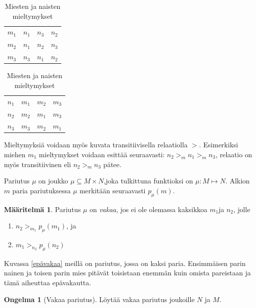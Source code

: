 \documentclass[finnish]{tktltiki2}
\theoremstyle{definition}
\newtheorem{maar}[lau]{Määritelmä}
\newtheorem{ong}{Ongelma}
\theoremstyle{remark}
\begin{document}
\begin{table}[t]\label{mieltymyksettaul}
\centering
	\begin{tabular}{ l | *{2}{c} r }
	 &  \\
	 \hline
 	 $m_{1}$ & $n_{1}$ & $n_{3}$ & $n_{2}$ \\
 	 $m_{2}$ & $n_{1}$ & $n_{2}$ & $n_{3}$ \\
 	 $m_{3}$ & $n_{3}$ & $n_{1}$ & $n_{2}$ \\
	\end{tabular}
	\quad
	\begin{tabular}{ l | *{2}{c} r }
	 &  \\
	 \hline
 	 $n_{1}$ & $m_{1}$ & $m_{2}$ & $m_{3}$ \\
 	 $n_{2}$ & $m_{2}$ & $m_{1}$ & $m_{3}$ \\
 	 $n_{3}$ & $m_{3}$ & $m_{2}$ & $m_{1}$ \\
	\end{tabular}
	\caption{Miesten ja naisten mieltymykset}
\end{table}

Mieltymyksiä voidaan myös kuvata transitiivisella relaatiolla $>$. Esimerkiksi miehen $m_1$ mieltymykset voidaan esittää seuraavasti: $n_2 >_{m} n_1 >_{m} n_3$, relaatio on myös transitiivinen eli $n_2 >_{m} n_3$ pätee.

Pariutus $\mu$ on joukko $\mu \subseteq M \times N$,joka tulkittuna funktioksi on  $\mu : M \mapsto N$. Alkion $m$ paria pariutuksessa $\mu$ merkitään seuraavasti $p_{\mu}(m)$.

\begin{maar}
Pariutus $\mu$ on \emph{vakaa}, jos ei ole olemassa kaksikkoa $m_1$ja  $n_2$, jolle
\begin{enumerate}
	\item $n_2 >_{m_{1}} p_{\mu}(m_1)$, ja
	\item $m_1 >_{n_{2}} p_{\mu}(n_2)$
\end{enumerate}


Kuvassa \ref{epävakaa} meillä on pariutus, jossa on kaksi paria. Ensimmäisen parin nainen ja toisen parin mies pitävät toisistaan enemmän kuin omista pareistaan ja tämä aiheuttaa epävakautta.

\begin{ong}[Vakaa pariutus]
Löytää  vakaa pariutus joukoille $N$ ja $M$.
\end{ong}
\end{maar}
\end{document}
